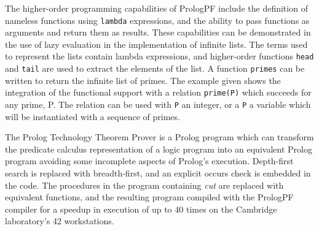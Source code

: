 The higher-order programming capabilities of PrologPF include the definition of nameless
functions using \texttt{lambda} expressions, and the ability to pass functions as arguments
and return them as results.  These capabilities can be demonstrated in the use
of lazy evaluation in the implementation of infinite lists.  The terms used to represent
the lists contain lambda expressions, and higher-order functions \texttt{head} and
\texttt{tail} are used to extract the elements of the list.  A function \texttt{primes}
can be written to return the infinite list of primes.  The example given shows the
integration of the functional support with a relation \texttt{prime(P)} which succeeds for
any prime, P.  The relation can be used with \texttt{P} an integer, or a 
\texttt{P} a variable which
will be instantiated with a sequence of primes.

The Prolog Technology Theorem Prover is a Prolog program which can transform the predicate
calculus representation of a logic program into an equivalent Prolog program avoiding
some incomplete aspects of Prolog's execution.  Depth-first search is replaced with
breadth-first, and an explicit occurs check is embedded in the code.  The procedures in the
program containing \textit{cut} are replaced with equivalent functions, and the
resulting program compiled with the PrologPF compiler for a speedup in execution of up
to 40 times on the Cambridge laboratory's 42 workstations.
